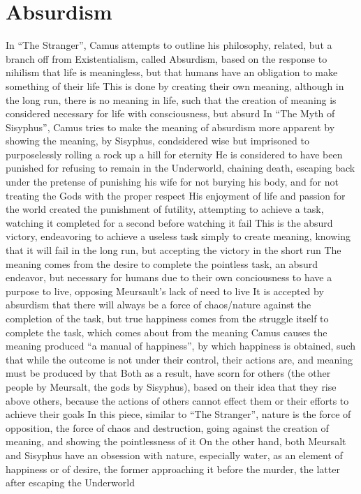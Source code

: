 \documentclass[11 pt, twoside]{article}
\newenvironment{outline*}
{
	\begin{outline}[enumerate]
	}
	{\end{outline}
}
\begin{document}
\section{Absurdism}
\begin{outline*}
\1 In ``The Stranger'', Camus attempts to outline his philosophy, related, but a branch off from Existentialism, called Absurdism, based on the response to nihilism that life is meaningless, but that humans have an obligation to make something of their life
\2 This is done by creating their own meaning, although in the long run, there is no meaning in life, such that the creation of meaning is considered necessary for life with consciousness, but absurd
\1 In ``The Myth of Sisyphus'', Camus tries to make the meaning of absurdism more apparent by showing the meaning, by Sisyphus, condsidered wise but imprisoned to purposelessly rolling a rock up a hill for eternity
\2 He is considered to have been punished for refusing to remain in the Underworld, chaining death, escaping back under the pretense of punishing his wife for not burying his body, and for not treating the Gods with the proper respect
\2 His enjoyment of life and passion for the world created the punishment of futility, attempting to achieve a task, watching it completed for a second before watching it fail
\3 This is the absurd victory, endeavoring to achieve a useless task simply to create meaning, knowing that it will fail in the long run, but accepting the victory in the short run
\2 The meaning comes from the desire to complete the pointless task, an absurd endeavor, but necessary for humans due to their own conciousness to have a purpose to live, opposing Meursault's lack of need to live
\3 It is accepted by absurdism that there will always be a force of chaos/nature against the completion of the task, but true happiness comes from the struggle itself to complete the task, which comes about from the meaning
\3 Camus causes the meaning produced ``a manual of happiness'', by which happiness is obtained, such that while the outcome is not under their control, their actions are, and meaning must be produced by that
\3 Both as a result, have scorn for others (the other people by Meursalt, the gods by Sisyphus), based on their idea that they rise above others, because the actions of others cannot effect them or their efforts to achieve their goals
\2 In this piece, similar to ``The Stranger'', nature is the force of opposition, the force of chaos and destruction, going against the creation of meaning, and showing the pointlessness of it
\3 On the other hand, both Meursalt and Sisyphus have an obsession with nature, especially water, as an element of happiness or of desire, the former approaching it before the murder, the latter after escaping the Underworld
\end{outline*}
\end{document}
